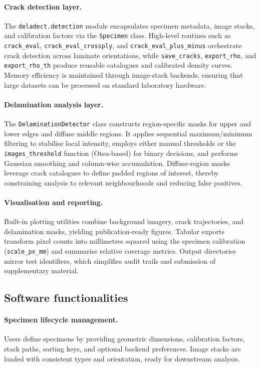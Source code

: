 \documentclass[preprint,12pt,a4paper]{elsarticle}
\begin{document}
\paragraph{Crack detection layer.} The \texttt{deladect.detection} module encapsulates specimen metadata,
image stacks, and calibration factors via the \texttt{Specimen} class. High-level routines such as
\texttt{crack\_eval}, \texttt{crack\_eval\_crossply}, and \texttt{crack\_eval\_plus\_minus} orchestrate
crack detection across laminate orientations, while \texttt{save\_cracks}, \texttt{export\_rho}, and
\texttt{export\_rho\_th} produce reusable catalogues and calibrated density curves. Memory efficiency is
maintained through image-stack backends, ensuring that large datasets can be processed on standard
laboratory hardware.

\paragraph{Delamination analysis layer.} The \texttt{DelaminationDetector} class constructs
region-specific masks for upper and lower edges and diffuse middle regions. It applies sequential
maximum/minimum filtering to stabilise local intensity, employs either manual thresholds or the
\texttt{images\_threshold} function (Otsu-based) for binary decisions, and performs Gaussian smoothing
and column-wise accumulation. Diffuse-region masks leverage crack catalogues to define padded regions of
interest, thereby constraining analysis to relevant neighbourhoods and reducing false positives.

\paragraph{Visualisation and reporting.} Built-in plotting utilities combine background imagery, crack
trajectories, and delamination masks, yielding publication-ready figures. Tabular exports transform pixel
counts into millimetres squared using the specimen calibration (\texttt{scale\_px\_mm}) and summarise
relative coverage metrics. Output directories mirror test identifiers, which simplifies audit trails and
submission of supplementary material.

\subsection{Software functionalities}
\paragraph{Specimen lifecycle management.} Users define specimens by providing geometric dimensions,
calibration factors, stack paths, sorting keys, and optional backend preferences. Image stacks are loaded
with consistent types and orientation, ready for downstream analysis.
\end{document}
